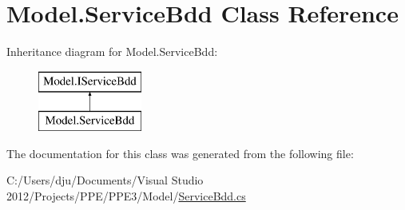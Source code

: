 \hypertarget{class_model_1_1_service_bdd}{\section{Model.\-Service\-Bdd Class Reference}
\label{class_model_1_1_service_bdd}
}
Inheritance diagram for Model.\-Service\-Bdd\-:\begin{figure}[H]
\begin{center}
\leavevmode
\includegraphics[height=2.000000cm]{class_model_1_1_service_bdd}
\end{center}
\end{figure}


The documentation for this class was generated from the following file\-:\begin{DoxyCompactItemize}
\item 
C\-:/\-Users/dju/\-Documents/\-Visual Studio 2012/\-Projects/\-P\-P\-E/\-P\-P\-E3/\-Model/\hyperlink{_service_bdd_8cs}{Service\-Bdd.\-cs}\end{DoxyCompactItemize}
